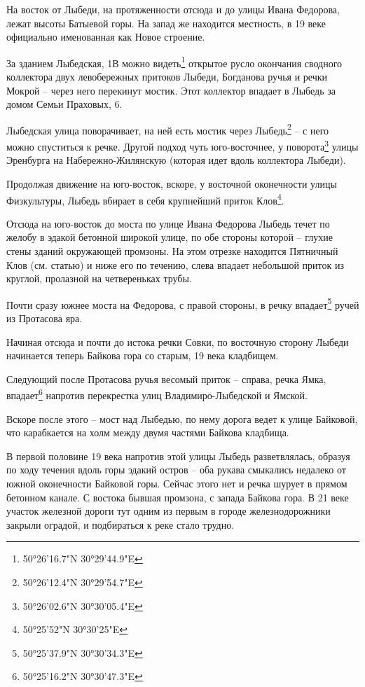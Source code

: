 На восток от Лыбеди, на протяженности отсюда и до улицы Ивана Федорова, лежат высоты Батыевой горы. На запад же находится местность, в 19 веке официально именованная как Новое строение.

За зданием Лыбедская, 1В можно видеть\footnote{50°26'16.7"N 30°29'44.9"E} открытое русло окончания сводного коллектора двух левобережных притоков Лыбеди, Богданова ручья и речки Мокрой – через него перекинут мостик. Этот коллектор впадает в Лыбедь за домом Семьи Праховых, 6.

Лыбедская улица поворачивает, на ней есть мостик через Лыбедь\footnote{50°26'12.4"N 30°29'54.7"E} – с него можно спуститься к речке. Другой подход чуть юго-восточнее, у поворота\footnote{50°26'02.6"N 30°30'05.4"E} улицы Эренбурга на Набережно-Жилянскую (которая идет вдоль коллектора Лыбеди).

Продолжая движение на юго-восток, вскоре, у восточной оконечности улицы Физкультуры, Лыбедь вбирает в себя крупнейший приток Клов\footnote{50°25'52"N 30°30'25"E}.

Отсюда на юго-восток до моста по улице Ивана Федорова Лыбедь течет по желобу в эдакой бетонной широкой улице, по обе стороны которой – глухие стены зданий окружающей промзоны. На этом отрезке находится Пятничный Клов (см. статью) и ниже его по течению, слева впадает небольшой приток из круглой, пролазной на четвереньках трубы. 

Почти сразу южнее моста на Федорова, с правой стороны, в речку впадает\footnote{50°25'37.9"N 30°30'34.3"E} ручей из Протасова яра.

Начиная отсюда и почти до истока речки Совки, по восточную сторону Лыбеди начинается теперь Байкова гора со старым, 19 века кладбищем.

Следующий после Протасова ручья весомый приток – справа, речка Ямка, впадает\footnote{50°25'16.2"N 30°30'47.3"E} напротив перекрестка улиц Владимиро-Лыбедской и Ямской.

Вскоре после этого – мост над Лыбедью, по нему дорога ведет к улице Байковой, что карабкается на холм между двумя частями Байкова кладбища.

В первой половине 19 века напротив этой улицы Лыбедь разветвлялась, образуя по ходу течения вдоль горы эдакий остров – оба рукава смыкались недалеко от южной оконечности Байковой горы. Сейчас этого нет и речка шурует в прямом бетонном канале. С востока бывшая промзона, с запада Байкова гора. В 21 веке участок железной дороги тут одним из первым в городе железнодорожники закрыли оградой, и подбираться к реке стало трудно.

